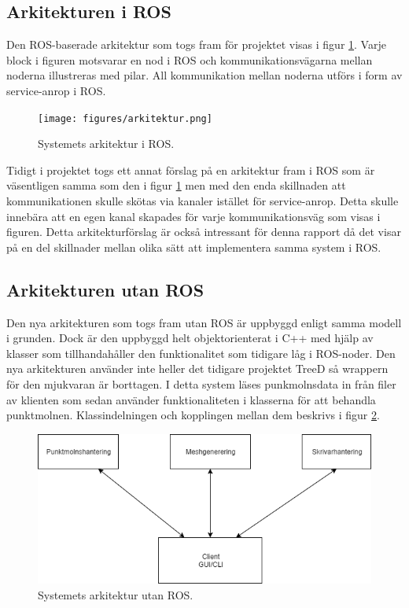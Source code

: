 \subsection{Arkitekturen i ROS}
Den ROS-baserade arkitektur som togs fram för projektet visas i figur \ref{fig:arkitektur}. Varje block i figuren motsvarar en nod i ROS och kommunikationsvägarna mellan noderna illustreras med pilar. All kommunikation mellan noderna utförs i form av service-anrop i ROS.

\begin{figure}[h]
	\centering
	\texttt{[image: figures/arkitektur.png]}
	\caption{Systemets arkitektur i ROS.}
	\label{fig:arkitektur}
\end{figure}

Tidigt i projektet togs ett annat förslag på en arkitektur fram i ROS som är väsentligen samma som den i figur \ref{fig:arkitektur} men med den enda skillnaden att kommunikationen skulle skötas via kanaler istället för service-anrop. Detta skulle innebära att en egen kanal skapades för varje kommunikationsväg som visas i figuren. Detta arkitekturförslag är också intressant för denna rapport då det visar på en del skillnader mellan olika sätt att implementera samma system i ROS.

\subsection{Arkitekturen utan ROS}
Den nya arkitekturen som togs fram utan ROS är uppbyggd enligt samma modell i grunden. Dock är den uppbyggd helt objektorienterat i C++ med hjälp av klasser som tillhandahåller den funktionalitet som tidigare låg i ROS-noder. Den nya arkitekturen använder inte heller det tidigare projektet TreeD så wrappern för den mjukvaran är borttagen. I detta system läses punkmolnsdata in från filer av klienten som sedan använder funktionaliteten i klasserna för att behandla punktmolnen. Klassindelningen och kopplingen mellan dem beskrivs i figur \ref{fig:klasser}.

\begin{figure}[h]
	\centering
	\includegraphics[width=15cm]{figures/klasser_arkitektur.png}
	\caption{Systemets arkitektur utan ROS.}
	\label{fig:klasser}
\end{figure}


